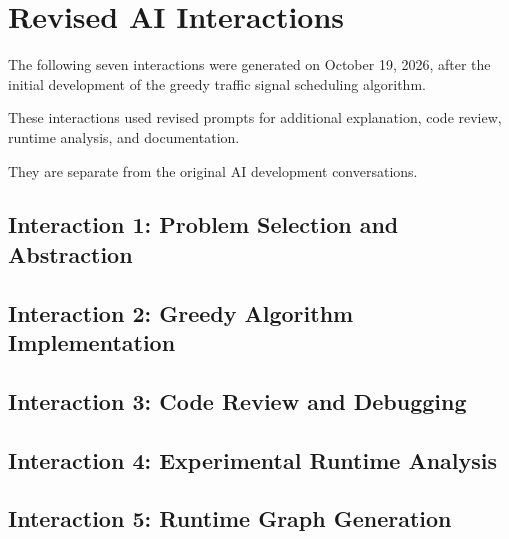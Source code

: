 \section{Revised AI Interactions}

The following seven interactions were
generated on October 19, 2026, after
the initial development of the greedy
traffic signal scheduling algorithm.

These interactions used revised prompts
for additional explanation, code review,
runtime analysis, and documentation.

They are separate from the original
AI development conversations.

\subsection{Interaction 1:
Problem Selection and Abstraction}


\subsection{Interaction 2:
Greedy Algorithm Implementation}


\subsection{Interaction 3:
Code Review and Debugging}


\subsection{Interaction 4:
Experimental Runtime Analysis}


\subsection{Interaction 5:
Runtime Graph Generation}


